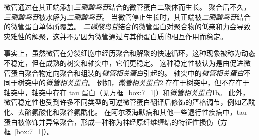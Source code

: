 微管通过在其正端添加\textit{三磷酸鸟苷}结合的微管蛋白二聚体而生长。
聚合后不久，\textit{三磷酸鸟苷}被水解为\textit{二磷酸鸟苷}。
当微管停止生长时，其正端被\textit{二磷酸鸟苷}结合的微管蛋白单体所覆盖。
\textit{二磷酸鸟苷}结合的微管蛋白对聚合物的低亲和力会导致灾难性的解聚，这并不是因为微管通过与其他蛋白质的相互作用而稳定。


事实上，虽然微管在分裂细胞中经历聚合和解聚的快速循环，这种现象被称为动态不稳定，但在成熟的树突和轴突中，它们更稳定。
这种稳定性被认为是由促进微管蛋白聚合物定向聚合和组装的\textit{微管相关蛋白}引起的。
轴突中的\textit{微管相关蛋白}不同于树突中的\textit{微管相关蛋白}。
例如，\textit{微管相关蛋白}2 存在于树突中，但不存在于轴突中，轴突中存在 tau 蛋白（见方框~\ref{box:7_1}）和\textit{微管相关蛋白}1b。
此外，微管稳定性也受到许多不同类型的可逆微管蛋白翻译后修饰的严格调节，例如乙酰化、去酪氨酸化和聚谷氨酰化。
在阿尔茨海默病和其他一些退行性疾病中，tau 蛋白被修饰并异常聚合，形成一种称为神经原纤维缠结的特征性损伤（方框~\ref{box:7_1}）。


